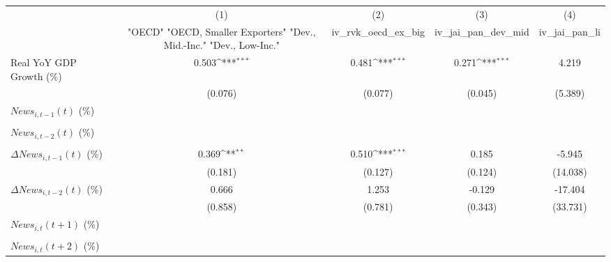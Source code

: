 {
\def\sym#1{\ifmmode^{#1}\else\(^{#1}\)\fi}
\begin{tabular}{l*{4}{c}}
\toprule
                    &\multicolumn{1}{c}{(1)}&\multicolumn{1}{c}{(2)}&\multicolumn{1}{c}{(3)}&\multicolumn{1}{c}{(4)}\\
                    &\multicolumn{1}{c}{ "OECD" "OECD, Smaller Exporters" "Dev., Mid.-Inc." "Dev., Low-Inc."}&\multicolumn{1}{c}{iv_rvk_oecd_ex_big}&\multicolumn{1}{c}{iv_jai_pan_dev_mid}&\multicolumn{1}{c}{iv_jai_pan_li}\\
\midrule
Real YoY GDP Growth (\%)&       0.503\sym{***}&       0.481\sym{***}&       0.271\sym{***}&       4.219         \\
                    &     (0.076)         &     (0.077)         &     (0.045)         &     (5.389)         \\
\addlinespace
$ News_{i,t-1}(t)$ (\%)&                     &                     &                     &                     \\
                    &                     &                     &                     &                     \\
\addlinespace
$ News_{i,t-2}(t)$ (\%)&                     &                     &                     &                     \\
                    &                     &                     &                     &                     \\
\addlinespace
$ \Delta News_{i,t-1}(t)$ (\%)&       0.369\sym{**} &       0.510\sym{***}&       0.185         &      -5.945         \\
                    &     (0.181)         &     (0.127)         &     (0.124)         &    (14.038)         \\
\addlinespace
$ \Delta News_{i,t-2}(t)$ (\%)&       0.666         &       1.253         &      -0.129         &     -17.404         \\
                    &     (0.858)         &     (0.781)         &     (0.343)         &    (33.731)         \\
\addlinespace
$ News_{i,t}(t+1)$ (\%)&                     &                     &                     &                     \\
                    &                     &                     &                     &                     \\
\addlinespace
$ News_{i,t}(t+2)$ (\%)&                     &                     &                     &                     \\

\end{tabular}}
